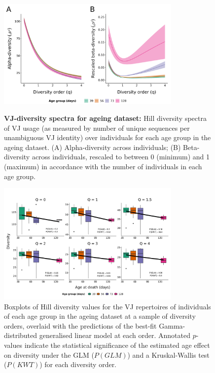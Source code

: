 
\begin{figure}
\centering
\includegraphics[width = 0.8\textwidth]{_Figures/png/ageing-VJ-diversity-alpha-beta}
\begin{subfigure}{0em}
\label{fig:igseq-ageing-VJ-diversity-alpha}
\end{subfigure}
\begin{subfigure}{0em}
\label{fig:igseq-ageing-VJ-diversity-beta}
\end{subfigure}
\caption{\textbf{VJ-diversity spectra for ageing dataset:} Hill diversity spectra of VJ usage (as measured by number of unique sequences per unambiguous VJ identity) over individuals for each age group in the \igseq ageing dataset. (A) Alpha-diversity across individuals; (B) Beta-diversity across individuals, rescaled to between 0 (minimum) and 1 (maximum) in accordance with the number of individuals in each age group.}
\label{fig:igseq-ageing-VJ-diversity-spectra}
\end{figure}

\begin{figure}
\centering
\includegraphics[width = 0.8\textwidth]{_Figures/png/ageing-VJ-diversity-solo-fit-gamma}
\caption{Boxplots of Hill diversity values for the VJ repertoires of individuals of each age group in the \igseq ageing dataset at a sample of diversity orders, overlaid with the predictions of the best-fit Gamma-distributed generalised linear model at each order.  Annotated $p$-values indicate the statistical significance of the estimated age effect on diversity under the GLM ($P(GLM)$) and a Kruskal-Wallis test ($P(KWT)$) for each diversity order.}
\label{fig:igseq-ageing-VJ-diversity-solo-fit-gamma}
\end{figure}

